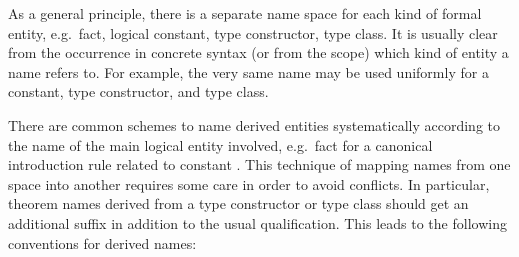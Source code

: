 \begin{isabellebody}
\begin{isamarkuptext}
  \bigskip As a general principle, there is a separate name space for
  each kind of formal entity, e.g.\ fact, logical constant, type
  constructor, type class.  It is usually clear from the occurrence in
  concrete syntax (or from the scope) which kind of entity a name
  refers to.  For example, the very same name  may be used
  uniformly for a constant, type constructor, and type class.

  There are common schemes to name derived entities systematically
  according to the name of the main logical entity involved, e.g.\
  fact  for a canonical introduction rule related to
  constant \isa{c}.  This technique of mapping names from one
  space into another requires some care in order to avoid conflicts.
  In particular, theorem names derived from a type constructor or type
  class should get an additional suffix in addition to the usual
  qualification.  This leads to the following conventions for derived
  names:


\end{isamarkuptext}
\end{isabellebody}
